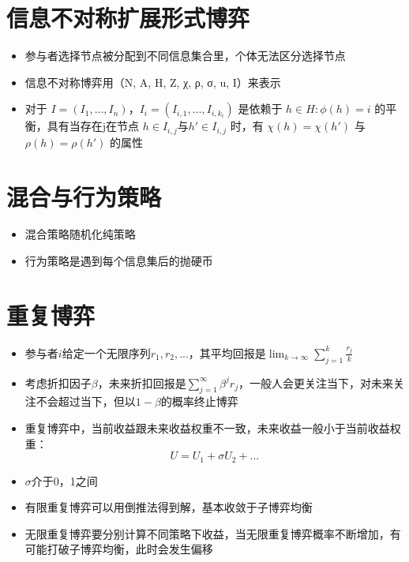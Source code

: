 \documentclass[]{book}
\providecommand{\tightlist}{%
  \setlength{\itemsep}{0pt}\setlength{\parskip}{0pt}}
\begin{document}
\section{信息不对称扩展形式博弈}

\begin{itemize}
\tightlist
\item
  参与者选择节点被分配到不同信息集合里，个体无法区分选择节点
\item
  信息不对称博弈用（N, A, H, Z, χ, ρ, σ, u, I）来表示
\item
  对于 \(I = (I_1,...,I_n)\)，\(I_i = (I_{i,1},...,I_{i,k_i})\) 是依赖于 \({h\in H: \phi (h) = i}\) 的平衡，具有当存在j在节点 \(h\in I_{i,j}\)与\(h'\in I_{i,j}\) 时，有 \(\chi(h) = \chi(h')\) 与 \(\rho(h) = \rho(h')\) 的属性
\end{itemize}

\section{混合与行为策略}

\begin{itemize}
\tightlist
\item
  混合策略随机化纯策略
\item
  行为策略是遇到每个信息集后的抛硬币
\end{itemize}

\section{重复博弈}

\begin{itemize}
\tightlist
\item
  参与者\(i\)给定一个无限序列\(r_1,r_2,...\)，其平均回报是\(\lim_{k\rightarrow\infty}\sum_{j=1}^k\frac{r_j}{k}\)
\item
  考虑折扣因子\(\beta\)，未来折扣回报是\(\sum_{j=1}^{\infty}\beta^jr_j\)，一般人会更关注当下，对未来关注不会超过当下，但以\(1-\beta\)的概率终止博弈
\item
  重复博弈中，当前收益跟未来收益权重不一致，未来收益一般小于当前收益权重：
  \[U = U_1 + \sigma U_2+ ...\]
\item
  \(\sigma\)介于0，1之间
\item
  有限重复博弈可以用倒推法得到解，基本收敛于子博弈均衡
\item
  无限重复博弈要分别计算不同策略下收益，当无限重复博弈概率不断增加，有可能打破子博弈均衡，此时会发生偏移
\end{itemize}
\end{document}
